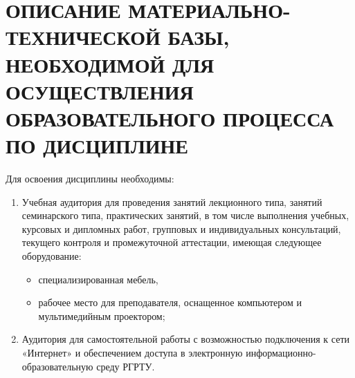 \chapter{ОПИСАНИЕ МАТЕРИАЛЬНО-ТЕХНИЧЕСКОЙ БАЗЫ, НЕОБХОДИМОЙ ДЛЯ ОСУЩЕСТВЛЕНИЯ ОБРАЗОВАТЕЛЬНОГО ПРОЦЕССА ПО ДИСЦИПЛИНЕ}
Для освоения дисциплины необходимы:
\begin{enumerate}
\item Учебная аудитория для проведения занятий лекционного типа, занятий семинарского типа, практических занятий, в том числе выполнения учебных, курсовых и дипломных работ, групповых и индивидуальных консультаций, текущего контроля и промежуточной аттестации, имеющая следующее оборудование: 
	\begin{itemize}
		\item специализированная мебель, 
		\item рабочее место для преподавателя, оснащенное компьютером и мультимедийным проектором;	
	\end{itemize}
\item Аудитория для самостоятельной работы с возможностью подключения к сети «Интернет» и обеспечением доступа в электронную информационно-образовательную среду РГРТУ.
\end{enumerate}
